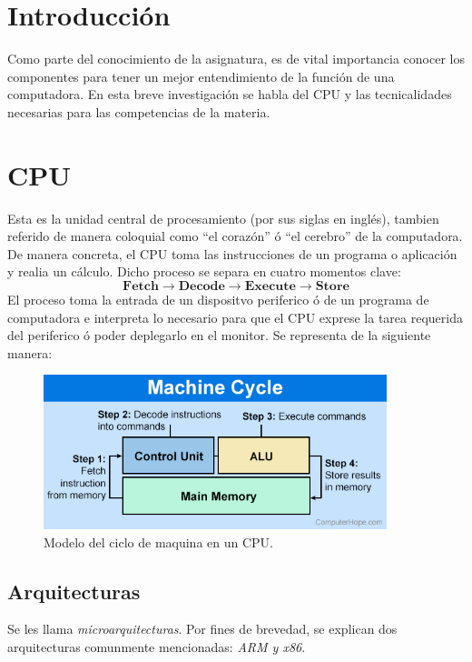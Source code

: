 \documentclass[letterpaper, 12pt]{article}
\begin{document}
    \newpage
    \begin{justify}
        \setcounter{page}{1}
        \thispagestyle{fancy}
        \section{Introducción}
        \justify
        Como parte del conocimiento de la asignatura, es de vital importancia conocer los componentes para tener un mejor entendimiento 
        de la función de una computadora. En esta breve investigación se habla del CPU y las tecnicalidades necesarias para las competencias de la materia.
        \section{CPU}
        \justify
        Esta es la unidad central de procesamiento (por sus siglas en inglés), tambien referido de manera coloquial como ``el corazón'' ó ``el cerebro'' de la computadora.
        De manera concreta, el CPU toma las instrucciones de un programa o aplicación y realia un cálculo. Dicho proceso se separa en cuatro momentos clave:
        \[\textbf{Fetch}\rightarrow\textbf{Decode}\rightarrow\textbf{Execute}\rightarrow\textbf{Store}\]
        El proceso toma la entrada de un dispositvo periferico ó de un programa de computadora e interpreta lo necesario para que el CPU exprese la tarea requerida del periferico ó poder
        deplegarlo en el monitor. Se representa de la siguiente manera:
        \begin{figure}[H]
            \centering
            \includegraphics[width=10cm]{cycle.png}
            \caption{Modelo del ciclo de maquina en un CPU.}
        \end{figure}
        \subsection{Arquitecturas}
        \justify
        Se les llama \emph{microarquitecturas}. Por fines de brevedad, se explican dos arquitecturas comunmente mencionadas: \emph{ARM y x86}.

\end{justify}
\end{document}
